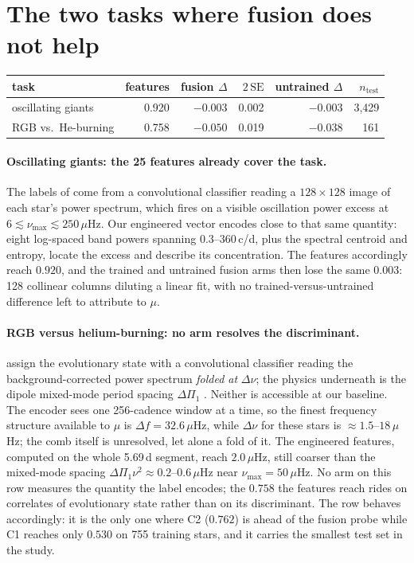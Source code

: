 \documentclass{article}
\begin{document}
\section{The two tasks where fusion does not help}
\label{app:negatives}

\begin{center}
\small
\begin{tabular}{lrrrrr}
\toprule
task & features & fusion $\Delta$ & $2\,\mathrm{SE}$ & untrained $\Delta$ & $n_{\mathrm{test}}$ \\
\midrule
oscillating giants & 0.920 & $-0.003$ & 0.002 & $-0.003$ & 3{,}429 \\
RGB vs.\ He-burning & 0.758 & $-0.050$ & 0.019 & $-0.038$ & 161 \\
\bottomrule
\end{tabular}
\end{center}

\paragraph{Oscillating giants: the 25 features already cover the task.} The labels of
\citet{hon2021} come from a convolutional classifier reading a $128 \times 128$ image of each star's
power spectrum, which fires on a visible oscillation power excess at
$6 \lesssim \nu_{\max} \lesssim 250\,\mu$Hz. Our engineered vector encodes close to that same
quantity: eight log-spaced band powers spanning 0.3--360\,c/d, plus the spectral centroid and
entropy, locate the excess and describe its concentration. The features accordingly reach $0.920$,
and the trained and untrained fusion arms then lose the same $0.003$: 128 collinear columns
diluting a linear fit, with no trained-versus-untrained difference left to attribute to $\mu$.

\paragraph{RGB versus helium-burning: no arm resolves the discriminant.} \citet{sreenivas2026} assign
the evolutionary state with a convolutional classifier reading the background-corrected power spectrum
\emph{folded at} $\Delta\nu$; the physics underneath is the dipole mixed-mode period spacing
$\Delta\Pi_{1}$ \citep{bedding2011}. Neither is accessible at our baseline. The encoder sees one
256-cadence window at a time, so the finest frequency structure available to $\mu$ is
$\Delta f = 32.6\,\mu$Hz, while $\Delta\nu$ for these stars is $\approx 1.5$--$18\,\mu$Hz; the comb
itself is unresolved, let alone a fold of it. The engineered features, computed on the whole 5.69\,d
segment, reach $2.0\,\mu$Hz, still coarser than the mixed-mode spacing
$\Delta\Pi_{1}\nu^{2} \approx 0.2$--$0.6\,\mu$Hz near $\nu_{\max} = 50\,\mu$Hz. No arm on this row
measures the quantity the label encodes; the $0.758$ the features reach rides on correlates of
evolutionary state rather than on its discriminant. The row behaves accordingly: it is the only one
where C2 ($0.762$) is ahead of the fusion probe while C1 reaches only $0.530$ on 755 training stars,
and it carries the smallest test set in the study.
\end{document}
